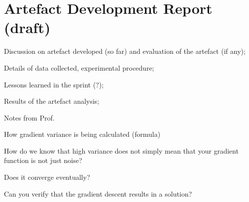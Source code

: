 \section{Artefact Development Report (draft)}
\begin{todolist}
    \item[\done] Discussion on artefact developed (so far) and evaluation of the artefact (if any);
    \item[\done] Details of data collected, experimental procedure;
    \item Lessons learned in the sprint (?);
    \item[\done] Results of the artefact analysis;
\end{todolist}

Notes from Prof.

\begin{todolist}
    \item[\done] How gradient variance is being calculated (formula)
    \item[\done] How do we know that high variance does not simply mean that your gradient function is not just noise?
    \item Does it converge eventually?
    \item Can you verify that the gradient descent results in a solution?
\end{todolist}




